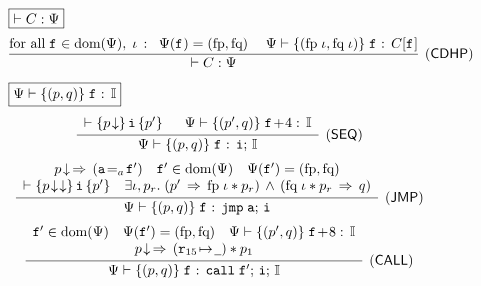 \begin{figure*}[!thp]
	\subfigure
	{
		\begin{minipage}{1\linewidth}
			$\boxed{\vdash C : \Psi}$ \quad \ \
			\[
				\infer[(\RULE{CDHP})]
				{
					\vdash \code : \Psi
				}
				{
					\text{for all} \; \lab{} \in \dom(\Psi), \; \lgvl \, :
					\; \; \Psi(\lab{}) = (\specpre, \specpost) \quad \;
					\wfcblk{\specpre \; \lgvl}{\specpost \; \lgvl}{\lab{}}{C[\lab{}]}
				}
			\]
		\end{minipage}
	}
	
	\subfigure
	{
		\begin{minipage}{1\linewidth}
			$\boxed{\Psi \vdash \{({p}, {q})\} \; {\texttt{f}_{}} : \, {\mathbb{I}}}$ \quad \ \ 
%
			\[
				\infer[(\RULE{SEQ})]
				{
					\wfcblk{\astP}{\astQ}{\lab{}}{\simplins; \, \cblk}
				}
				{
					\begin{array}{l}
						\wfins{\nxtAst{\astP}}{\simplins}{\astP'} \quad \; \;
						\wfcblk{\astP'}{\astQ}{\lab{}\!+\!4}{\cblk}
					\end{array}
				}
			\]
%
%
            \[
                \infer[(\RULE{JMP})]
                {
                    \wfcblk{\astP}{\astQ}{\lab{}}{\jmp \; \aexp; \, \simplins}
                }
                {
                    \begin{array}{c}
                        \nxtAst{\astP}
                          \,\Rightarrow\, (\aexpeq{\aexp}{\lab{}'}) \quad
                        \lab{}' \in \dom(\Psi) \quad \Psi(\lab{}') = (\specpre, \specpost) \\
                        \wfins{\nxtAst{\nxtAst{\astP}}}{\simplins}{\astP'} \quad
                        \exists \lgvl,\pr. \;
                        (\astP' \,\Rightarrow\,
                        \specpre \; \lgvl * \pr)
                        \, \land \,
                        (\specpost \; \lgvl * \pr \,\Rightarrow\, \astQ)
                    \end{array}
                }
            \]
%
			\[
				\infer[(\RULE{CALL})]
				{
					\wfcblk{\astP}{\astQ}{\lab{}}{\call \; \lab{}'; \, \simplins; \, \cblk}
				}
				{
					\begin{array}{c}
						\lab{}' \in \dom(\Psi) \quad
						\Psi (\lab{}') = (\specpre, \specpost) \quad
						\wfcblk{\astP'}{\astQ}{\lab{}\!+\!8}{\cblk} \\
						\nxtAst{\astP} \,\Rightarrow\,
                             (\regst{\reg{15}}{\notCare})
                                 * \astP_1

\end{array}}\]
\end{minipage}}
\end{figure*}
